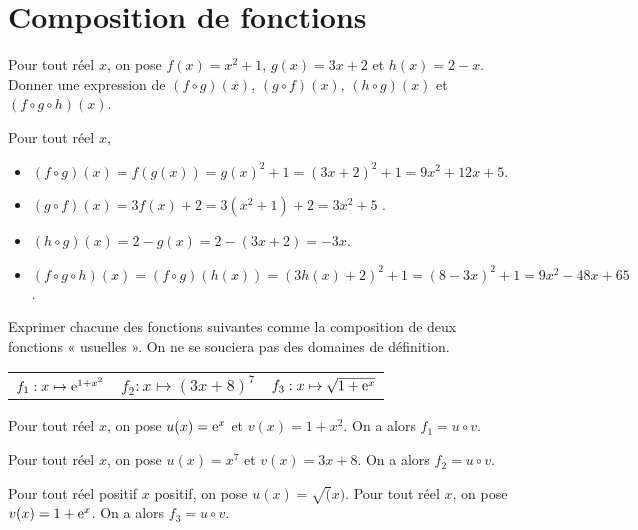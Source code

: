 \documentclass[11pt,fleqn, openany]{book} %
\begin{document}

\section*{Composition de fonctions}

\begin{exercise}[topic=der03]Pour tout réel $x$, on pose $f(x)=x^2+1$, $g(x)=3x+2$ et $h(x)=2-x$.\\
\noindent Donner une expression de $(f \circ g) (x)$, $(g \circ f) (x)$, $(h \circ g) (x)$ et   $(f \circ g \circ h) (x)$.
\end{exercise}

\begin{solution}Pour tout réel $x$,
\begin{itemize}
\item  $(f \circ g) (x)=f(g(x))=g(x)^2+1=(3x+2)^2+1=9x^2+12x+5$.
\vskip5pt
\item   $(g \circ f) (x)=3f(x)+2=3(x^2+1)+2=3x^2+5$ .
\vskip5pt
\item  $(h \circ g) (x)=2-g(x)=2-(3x+2)=-3x$.
\vskip5pt
\item $(f \circ g \circ h) (x)=(f \circ g)(h(x))=(3h(x)+2)^2+1=(8-3x)^2+1=9x^2-48x+65$.
\end{itemize}
\end{solution}

\begin{exercise}[topic=der03]Exprimer chacune des fonctions suivantes comme la composition de deux fonctions « usuelles ». On ne se souciera pas des domaines de définition.

\renewcommand{\arraystretch}{2}
\begin{tabularx}{\linewidth}{XXX}
 $f_1 : x \mapsto \mathrm{e}^{1+x^2}$&
 $f_2 : x \mapsto (3x+8)^7$&
  $f_3 : x \mapsto \sqrt{1+\mathrm{e}^x}$ \\
\end{tabularx}
\end{exercise}

\begin{solution}
Pour tout réel $x$, on pose $u(x)=\mathrm{e}^x$ et $v(x)=1+x^2$. On a alors $f_1=u \circ v$.

Pour tout réel $x$, on pose $u(x)=x^7$ et $v(x)=3x+8$. On a alors $f_2=u \circ v$.

Pour tout réel positif $x$ positif, on pose $u(x)=\sqrt(x)$. Pour tout réel $x$, on pose $v(x)=1+\mathrm{e}^x$. On a alors $f_3=u \circ v$.
\end{solution}
\end{document}
